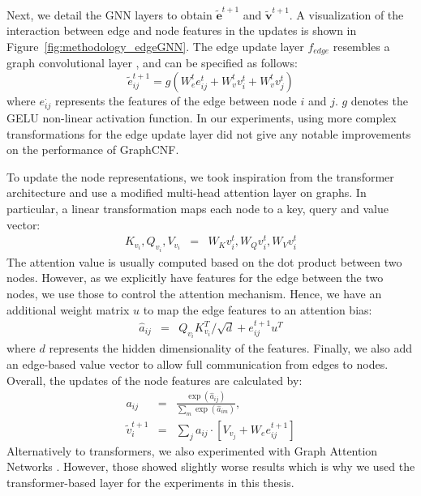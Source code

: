 Next, we detail the GNN layers to obtain $\tilde{\bm{e}}^{t+1}$ and $\tilde{\bm{v}}^{t+1}$. 
A visualization of the interaction between edge and node features in the updates is shown in Figure~\ref{fig:methodology_edgeGNN}.
The edge update layer $f_{edge}$ resembles a graph convolutional layer \cite{GraphOverview1}, and can be specified as follows:
\begin{equation}
	\tilde{e}^{t+1}_{ij} = g\left({W}^{t}_e e^{t}_{ij} + {W}^{t}_v v^{t}_{i} + {W}^{t}_v v^{t}_{j}\right)
\end{equation}
where $e^{\cdot}_{ij}$ represents the features of the edge between node $i$ and $j$. 
$g$ denotes the GELU \cite{GELU} non-linear activation function. 
In our experiments, using more complex transformations for the edge update layer did not give any notable improvements on the performance of GraphCNF.

To update the node representations, we took inspiration from the transformer architecture \cite{AttentionIsAllYouNeed} and use a modified multi-head attention layer on graphs. 
In particular, a linear transformation maps each node to a key, query and value vector:
\begin{eqnarray}
	K_{v_{i}}, Q_{v_{i}}, V_{v_{i}} & = & W_K v^{t}_{i}, W_Q v^{t}_{i}, W_V v^{t}_{i}
\end{eqnarray}
The attention value is usually computed based on the dot product between two nodes. 
However, as we explicitly have features for the edge between the two nodes, we use those to control the attention mechanism. 
Hence, we have an additional weight matrix $u$ to map the edge features to an attention bias:
\begin{eqnarray}
	\hat{a}_{ij} & = & Q_{v_{i}}K^T_{v_{i}}/\sqrt{d} + e^{t+1}_{ij}u^T
\end{eqnarray}
where $d$ represents the hidden dimensionality of the features. 
Finally, we also add an edge-based value vector to allow full communication from edges to nodes. 
Overall, the updates of the node features are calculated by:
\begin{eqnarray}
	a_{ij} & = & \frac{\exp\left(\hat{a}_{ij}\right)}{\sum_{m}\exp\left(\hat{a}_{im}\right)}, \\
	\tilde{v}^{t+1}_{i} & = & \sum_{j} a_{ij}\cdot \left[V_{v_{j}} + W_e  e^{t+1}_{ij}\right]
\end{eqnarray}
Alternatively to transformers, we also experimented with Graph Attention Networks \cite{GraphAttentionNetwork}. 
However, those showed slightly worse results which is why we used the transformer-based layer for the experiments in this thesis.

